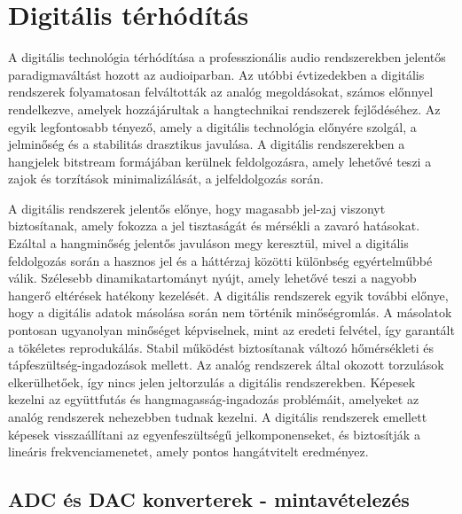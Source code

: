 \section{Digitális térhódítás} %
A digitális technológia térhódítása a professzionális audio rendszerekben jelentős paradigmaváltást hozott az audioiparban. 
Az utóbbi évtizedekben a digitális rendszerek folyamatosan felváltották az analóg megoldásokat, számos előnnyel rendelkezve, 
amelyek hozzájárultak a hangtechnikai rendszerek fejlődéséhez. 
Az egyik legfontosabb tényező, amely a digitális technológia előnyére szolgál, a jelminőség és a stabilitás drasztikus javulása. 
A digitális rendszerekben a hangjelek bitstream formájában kerülnek feldolgozásra, amely lehetővé teszi a zajok és torzítások minimalizálását,
a jelfeldolgozás során. 

A digitális rendszerek jelentős előnye, hogy magasabb jel-zaj viszonyt biztosítanak, amely fokozza a jel tisztaságát és mérsékli a zavaró hatásokat. 
Ezáltal a hangminőség jelentős javuláson megy keresztül, mivel a digitális feldolgozás során a hasznos jel és a 
háttérzaj közötti különbség egyértelműbbé válik.
Szélesebb dinamikatartományt nyújt, amely lehetővé teszi a nagyobb hangerő eltérések hatékony kezelését. 
A digitális rendszerek egyik további előnye, hogy a digitális adatok másolása során nem történik minőségromlás. 
A másolatok pontosan ugyanolyan minőséget képviselnek, mint az eredeti felvétel, így garantált a tökéletes reprodukálás.
Stabil működést biztosítanak változó hőmérsékleti és tápfeszültség-ingadozások mellett. 
Az analóg rendszerek által okozott torzulások elkerülhetőek, így nincs jelen jeltorzulás a digitális rendszerekben.
Képesek kezelni az együttfutás és hangmagasság-ingadozás problémáit, amelyeket az analóg rendszerek nehezebben tudnak kezelni.
A digitális rendszerek emellett képesek visszaállítani az egyenfeszültségű jelkomponenseket, és biztosítják 
a lineáris frekvenciamenetet, amely pontos hangátvitelt eredményez. 

\subsection{ADC és DAC konverterek - mintavételezés}

